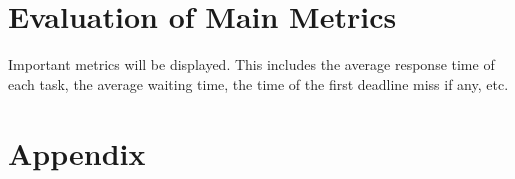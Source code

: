\section{Evaluation of Main Metrics}\label{sec:main-metrics}
Important metrics will be displayed. This includes the average response time of each task, the average waiting time, the time of the first deadline miss if any, etc.




\section*{Appendix}



